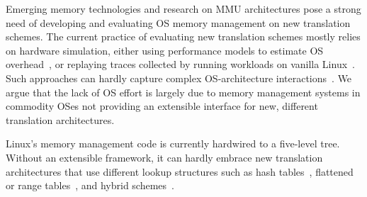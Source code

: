 \noindent
Emerging memory technologies and research on MMU architectures
	pose a strong need 
	of %
	developing and evaluating OS memory management 
	on new translation schemes.
The current practice of evaluating new translation schemes mostly relies on hardware simulation, 
	either using performance models to estimate OS overhead~\cite{self:dmt,margaritov2019asap,yaniv2016hash,karakostas2015redundant,alverti2020enhancing,ryoo2017rethinking},
	or replaying traces
	collected by running workloads on vanilla Linux~\cite{skarlatos2020ecpt,ryoo2017rethinking,yaniv2016hash,margaritov2019asap}.
Such approaches can hardly capture complex OS-architecture interactions~\cite{anderson91mach}.
We argue that the lack of OS effort is largely due to memory management systems 
	in commodity OSes not providing an extensible interface for new, different translation architectures.


%	


\noindent
Linux's memory management code is currently hardwired to a five-level tree.
Without an extensible framework,
	it can hardly embrace new translation architectures that use 
	different lookup structures such as hash tables~\cite{skarlatos2020ecpt,yaniv2016hash,jovan2023memory}, 
	flattened or range tables~\cite{park2022fpt,karakostas2015redundant,ahn2012revisiting}, 
	and hybrid schemes~\cite{kanellopoulos2023utopia,alam2017doityourself}.

